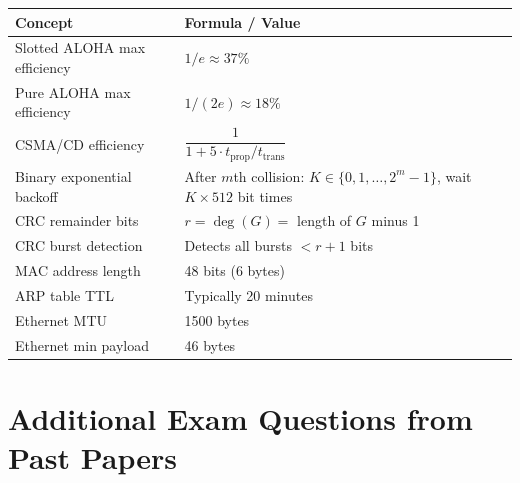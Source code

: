 \begin{formulabox}
\begin{center}
\begin{longtable}{p{5.5cm}p{8.5cm}}
\toprule
\textbf{Concept} & \textbf{Formula / Value} \\
\midrule
Slotted ALOHA max efficiency & $1/e \approx 37\%$ \\
\addlinespace
Pure ALOHA max efficiency & $1/(2e) \approx 18\%$ \\
\addlinespace
CSMA/CD efficiency & $\dfrac{1}{1 + 5 \cdot t_{\text{prop}} / t_{\text{trans}}}$ \\
\addlinespace
Binary exponential backoff & After $m$th collision: $K \in \{0, 1, \ldots, 2^m - 1\}$, wait $K \times 512$ bit times \\
\addlinespace
CRC remainder bits & $r = \deg(G) = $ length of $G$ minus 1 \\
\addlinespace
CRC burst detection & Detects all bursts $< r+1$ bits \\
\addlinespace
MAC address length & 48 bits (6 bytes) \\
\addlinespace
ARP table TTL & Typically 20 minutes \\
\addlinespace
Ethernet MTU & 1500 bytes \\
\addlinespace
Ethernet min payload & 46 bytes \\
\bottomrule
\end{longtable}
\end{center}
\end{formulabox}

\section{Additional Exam Questions from Past Papers}

